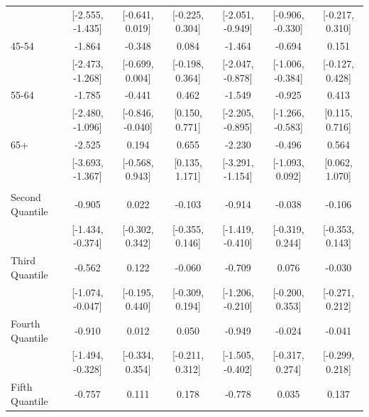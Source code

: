 \documentclass[
  10,
  letterpaper,
  DIV=11,
  numbers=noendperiod]{scrartcl}
\begin{document}
\begin{table}
\begin{tabular}[t]{lcccccc}
\hspace{1em} & {}[-2.555, -1.435] & {}[-0.641, 0.019] & {}[-0.225, 0.304] & {}[-2.051, -0.949] & {}[-0.906, -0.330] & {}[-0.217, 0.310]\\
\hspace{1em}45-54 & -1.864 & -0.348 & 0.084 & -1.464 & -0.694 & 0.151\\
\hspace{1em} & {}[-2.473, -1.268] & {}[-0.699, 0.004] & {}[-0.198, 0.364] & {}[-2.047, -0.878] & {}[-1.006, -0.384] & {}[-0.127, 0.428]\\
\hspace{1em}55-64 & -1.785 & -0.441 & 0.462 & -1.549 & -0.925 & 0.413\\
\hspace{1em} & {}[-2.480, -1.096] & {}[-0.846, -0.040] & {}[0.150, 0.771] & {}[-2.205, -0.895] & {}[-1.266, -0.583] & {}[0.115, 0.716]\\
\hspace{1em}65+ & -2.525 & 0.194 & 0.655 & -2.230 & -0.496 & 0.564\\
\hspace{1em} & {}[-3.693, -1.367] & {}[-0.568, 0.943] & {}[0.135, 1.171] & {}[-3.291, -1.154] & {}[-1.093, 0.092] & {}[0.062, 1.070]\\
\addlinespace[0.3em]
\multicolumn{7}{l}{\cellcolor[HTML]{3498DB}{\textbf{Income}}}\\
\hspace{1em}Second Quantile & -0.905 & 0.022 & -0.103 & -0.914 & -0.038 & -0.106\\
\hspace{1em} & {}[-1.434, -0.374] & {}[-0.302, 0.342] & {}[-0.355, 0.146] & {}[-1.419, -0.410] & {}[-0.319, 0.244] & {}[-0.353, 0.143]\\
\hspace{1em}Third Quantile & -0.562 & 0.122 & -0.060 & -0.709 & 0.076 & -0.030\\
\hspace{1em} & {}[-1.074, -0.047] & {}[-0.195, 0.440] & {}[-0.309, 0.194] & {}[-1.206, -0.210] & {}[-0.200, 0.353] & {}[-0.271, 0.212]\\
\hspace{1em}Fourth Quantile & -0.910 & 0.012 & 0.050 & -0.949 & -0.024 & -0.041\\
\hspace{1em} & {}[-1.494, -0.328] & {}[-0.334, 0.354] & {}[-0.211, 0.312] & {}[-1.505, -0.402] & {}[-0.317, 0.274] & {}[-0.299, 0.218]\\
\hspace{1em}Fifth Quantile & -0.757 & 0.111 & 0.178 & -0.778 & 0.035 & 0.137\\

\end{tabular}
\end{table}
\end{document}
